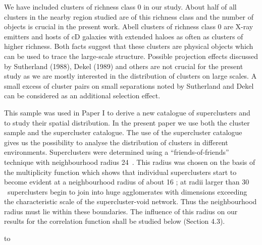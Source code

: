 We have included clusters of richness class 0 in our study. About half
of all clusters in the nearby region studied are of this richness
class and the number of objects is crucial in the present work.  Abell
clusters of richness class 0 are X-ray emitters and hosts of cD
galaxies with extended haloes as often as clusters of higher richness.
Both facts suggest that these clusters are physical objects which can
be used to trace the large-scale structure.  Possible projection
effects discussed by Sutherland (1988), Dekel \etal (1989) and others
are not crucial for the present study as we are mostly interested in
the distribution of clusters on large scales.  A small excess of
cluster pairs on small separations noted by Sutherland and Dekel \etal
can be considered as an additional selection effect. 

This sample was used in Paper I to derive a new catalogue of
superclusters and to study their spatial distribution.  In the
present paper we use both the cluster sample and the supercluster
catalogue.  The use of the supercluster catalogue gives us the
possibility to analyse the distribution of clusters in different
environments. Superclusters were determined using a
``friends-of-friends'' technique with neighbourhood radius
24~\Mpc. This radius was chosen on the basis of the multiplicity
function which shows that individual superclusters start to become
evident at a neighbourhood radius of about 16
\Mpc; at radii larger than 30 \Mpc\ superclusters begin to join into
huge agglomerates with dimensions exceeding the characteristic scale
of the supercluster-void network. Thus the neighbourhood radius must
lie within these boundaries. The influence of this radius on our
results for the correlation function shall be studied below (Section
4.3).

\begin{table}
\begin{minipage}{120mm}
\caption{ Selection function parameters}
\halign to 
\end{minipage}
\end{table}



